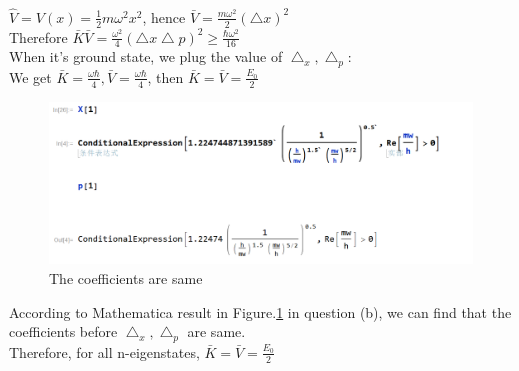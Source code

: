 \documentclass[a4paper]{article}
\begin{document}
\begin{enumerate}[(a)]
        \\$\hat{V}=V(x)=\frac{1}{2}m\omega^2x^2$, hence $\bar{V}=\frac{m\omega^2}{2}(\bigtriangleup x)^2$
        \\Therefore $\bar{K}\bar{V}=\frac{\omega^2}{4}(\bigtriangleup x\bigtriangleup p)^2\geq\frac{\hbar\omega^2}{16}$
        \\When it's ground state, we plug the value of $\bigtriangleup_x,\bigtriangleup_p$:
        \\We get $\bar{K}=\frac{\omega\hbar}{4},\bar{V}=\frac{\omega\hbar}{4}$, then $\bar{K}=\bar{V}=\frac{E_0}{2}$
        \begin{figure}[H]
            \centering
            \includegraphics[scale=0.25]{P5.png}
            \caption{The coefficients are same}
            \label{Coefficient}
        \end{figure}
        According to Mathematica result in Figure.\ref{Coefficient} in question (b), we can find that the coefficients before $\bigtriangleup_x,\bigtriangleup_p$ are same.
        \\Therefore, for all n-eigenstates, $\bar{K}=\bar{V}=\frac{E_0}{2}$
    \end{enumerate}
\end{document}
